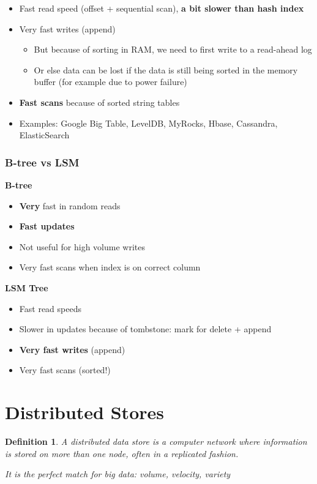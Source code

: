 \documentclass{article}
\newtheorem{theorem}{Definition}[section]
\begin{document}
\begin{itemize}
    \item Fast read speed (offset + sequential scan), \textbf{a bit slower than hash index}
    \item Very fast writes (append)
    \begin{itemize}
        \item But because of sorting in RAM, we need to first write to a read-ahead log
        \item Or else data can be lost if the data is still being sorted in the memory buffer (for example due to power failure)
    \end{itemize}
    \item \textbf{Fast scans} because of sorted string tables
    \item Examples: Google Big Table, LevelDB, MyRocks, Hbase, Cassandra, ElasticSearch
\end{itemize}

\subsubsection{B-tree vs LSM}

\textbf{B-tree}

\begin{itemize}
    \item \textbf{Very} fast in random reads
    \item \textbf{Fast updates}
    \item Not useful for high volume writes
    \item Very fast scans when index is on correct column
\end{itemize}

\textbf{LSM Tree}

\begin{itemize}
    \item Fast read speeds
    \item Slower in updates because of tombstone: mark for delete + append
    \item \textbf{Very fast writes} (append)
    \item Very fast scans (sorted!)
\end{itemize}

\section{Distributed Stores}

\begin{theorem}
    A distributed data store is a computer network where information is stored on 
    more than one node, often in a replicated fashion.

    It is the perfect match for big data: volume, velocity, variety
\end{theorem}
\end{document}
